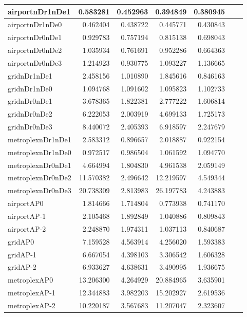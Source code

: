 \begin{longtable}{|l|r|r|r|r|r|r|}
\endlastfoot
airportnDr1nDe1 & 0.583281 & 0.452963 & 0.394849 & 0.380945 \\ \hline
airportnDr1nDe0 & 0.462404 & 0.438722 & 0.445771 & 0.430843 \\ \hline
airportnDr0nDe1 & 0.929783 & 0.757194 & 0.815138 & 0.698043 \\ \hline
airportnDr0nDe2 & 1.035934 & 0.761691 & 0.952286 & 0.664363 \\ \hline
airportnDr0nDe3 & 1.214923 & 0.930775 & 1.093227 & 1.136665 \\ \hline
gridnDr1nDe1 & 2.458156 & 1.010890 & 1.845616 & 0.846163 \\ \hline
gridnDr1nDe0 & 1.094768 & 1.091602 & 1.095823 & 1.102733 \\ \hline
gridnDr0nDe1 & 3.678365 & 1.822381 & 2.777222 & 1.606814 \\ \hline
gridnDr0nDe2 & 6.222053 & 2.003919 & 4.699133 & 1.725173 \\ \hline
gridnDr0nDe3 & 8.440072 & 2.405393 & 6.918597 & 2.247679 \\ \hline
metroplexnDr1nDe1 & 2.583312 & 0.896657 & 2.018887 & 0.922154 \\ \hline
metroplexnDr1nDe0 & 0.972517 & 0.986504 & 1.061592 & 1.094770 \\ \hline
metroplexnDr0nDe1 & 4.664994 & 1.804830 & 4.961538 & 2.059149 \\ \hline
metroplexnDr0nDe2 & 11.570382 & 2.496642 & 12.219597 & 4.549344 \\ \hline
metroplexnDr0nDe3 & 20.738309 & 2.813983 & 26.197783 & 4.243883 \\ \hline
airportAP0 & 1.814666 & 1.714804 & 0.773938 & 0.741170 \\ \hline
airportAP-1 & 2.105468 & 1.892849 & 1.040886 & 0.809843 \\ \hline
airportAP-2 & 2.248870 & 1.974311 & 1.037113 & 0.840687 \\ \hline
gridAP0 & 7.159528 & 4.563914 & 4.256020 & 1.593383 \\ \hline
gridAP-1 & 6.667054 & 4.398103 & 3.306542 & 1.606328 \\ \hline
gridAP-2 & 6.933627 & 4.638631 & 3.490995 & 1.936675 \\ \hline
metroplexAP0 & 13.206300 & 4.264929 & 20.884965 & 3.635901 \\ \hline
metroplexAP-1 & 12.344883 & 3.982203 & 15.202927 & 2.619536 \\ \hline
metroplexAP-2 & 10.220187 & 3.567683 & 11.207047 & 2.323607 \\ \hline

\end{longtable}
